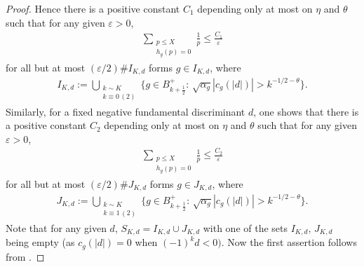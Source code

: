 \documentclass[a4paper,10pt,twoside]{amsart}
\theoremstyle{definition}
\numberwithin{equation}{section}
\renewcommand\:{\colon}
\begin{document}
\begin{proof}
Hence there is a positive constant $C_1$ depending only at most on $\eta$ and $\theta$ such that for any given $\varepsilon>0$,
\begin{align*}
\sum_{\substack{p\leq X \\
h_g(p)=0}}\frac1p\leq\frac {C_1}{\varepsilon}
\end{align*}
for all but at most $(\varepsilon/2)\# I_{K,d}$ forms $g\in I_{K,d}$, where
\begin{align*}
I_{K,d}:=\bigcup_{\substack{k\sim K\\
k\equiv 0\,(2)}}\{g\in B_{k+\frac12}^+:\,\sqrt{\alpha_g}|c_g(|d|)|>k^{-1/2-\theta}\}.
\end{align*}
Similarly, for a fixed negative fundamental discriminant $d$, one shows that there is a positive constant $C_2$ depending only at most on $\eta$ and $\theta$ such that for any given $\varepsilon>0$,
\begin{align*}
\sum_{\substack{p\leq X \\
h_g(p)=0}}\frac1p\leq\frac{C_2}{\varepsilon}
\end{align*}
for all but at most $(\varepsilon/2)\# J_{K,d}$ forms $g\in J_{K,d}$, where
\begin{align*}
J_{K,d}:=\bigcup_{\substack{k\sim K\\
k\equiv 1\,(2)}}\{g\in B_{k+\frac12}^+:\,\sqrt{\alpha_g}|c_g(|d|)|>k^{-1/2-\theta}\}.
\end{align*} 
Note that for any given $d$, $S_{K,d}=I_{K,d}\cup J_{K,d}$ with one of the sets $I_{K,d},\, J_{K,d}$ being empty (as $c_g(|d|)=0$ when $(-1)^kd<0)$. Now the first assertion follows from \cite[Theorem 2]{Hildebrand1987}. 


\end{proof}
\end{document}
